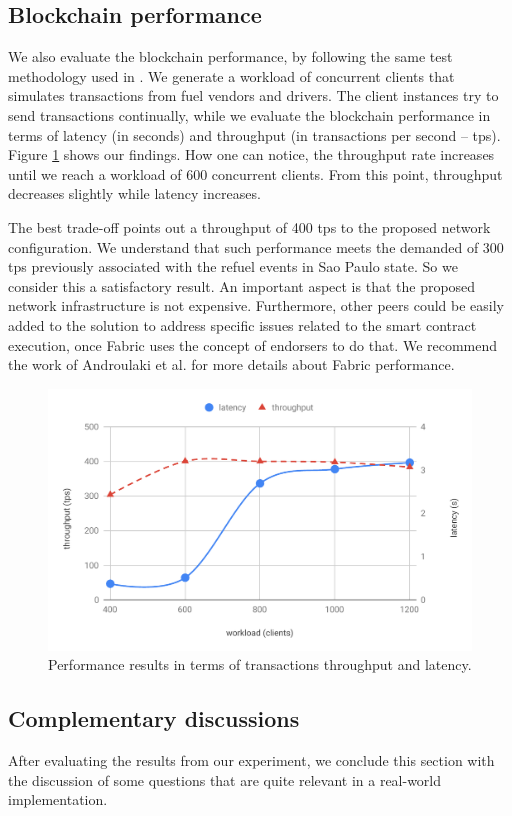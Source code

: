 \documentclass[sigplan]{acmart}
\begin{document}
\subsection{Blockchain performance}
We also evaluate the blockchain performance, by following the same test methodology used in \cite{MeloJr.2019}.
We generate a workload of concurrent clients that simulates transactions from fuel vendors and drivers.
The client instances try to send transactions continually, while we evaluate the blockchain performance in terms of latency (in seconds) and throughput (in transactions per second -- tps).
Figure \ref{f:performance} shows our findings.
How one can notice, the throughput rate increases until we reach a workload of 600 concurrent clients.
From this point, throughput decreases slightly while latency increases.

The best trade-off points out a throughput of 400 tps to the proposed network configuration.
We understand that such performance meets the demanded of 300 tps previously associated with the refuel events in Sao Paulo state.
So we consider this a satisfactory result.
An important aspect is that the proposed network infrastructure is not expensive.
Furthermore, other peers could be easily added to the solution to address specific issues related to the smart contract execution, once Fabric uses the concept of endorsers to do that.
We recommend the work of Androulaki et al. \cite{Androulaki2018} for more details about Fabric performance.

\begin{figure}[!t]
\centering
\includegraphics[width=.4\textwidth]{performance}
\caption{Performance results in terms of transactions throughput and latency.}
\label{f:performance}
\end{figure}

\subsection{Complementary discussions}
After evaluating the results from our experiment, we conclude this section with the discussion of some questions that are quite relevant in a real-world implementation.
\end{document}
